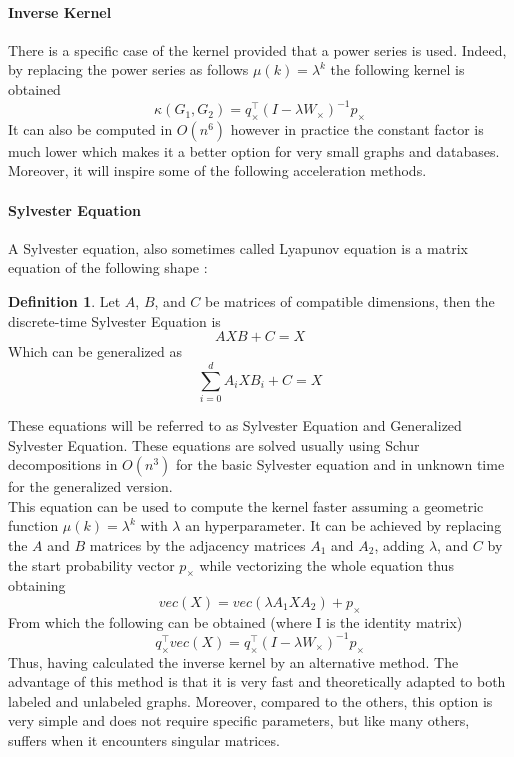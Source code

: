 \documentclass{article}
\theoremstyle{definition}
\newtheorem{definition}{Definition}
\begin{document}
\paragraph{Inverse Kernel}
There is a specific case of the kernel provided that a power series is used. Indeed, by replacing the power series as follows $\mu(k)=\lambda^k$ the following kernel is obtained 
\begin{equation}
	\kappa(G_1,G_2)=q_{\times}^{\top}(I-\lambda W_\times)^{-1}p_{\times}
\end{equation}
It can also be computed in $O(n^6)$ however in practice the constant factor is much lower which makes it a better option for very small graphs and databases. Moreover, it will inspire some of the following acceleration methods.
\paragraph{Sylvester Equation}
A Sylvester equation, also sometimes called Lyapunov equation is a matrix equation of the following shape :
\begin{definition}
	Let $A$, $B$, and $C$ be matrices of compatible dimensions, then the discrete-time Sylvester Equation is 
	\begin{equation}
	AXB+C=X
	\end{equation}
	Which can be generalized as
	\begin{equation}
		\sum_{i=0}^{d}A_{i}XB_{i}+C=X
	\end{equation}
\end{definition}
These equations will be referred to as Sylvester Equation and Generalized Sylvester Equation. These equations are solved usually using Schur decompositions in $O(n^3)$ for the basic Sylvester equation and in unknown time for the generalized version\cite{vishwanathan_graph_2010}.\\
This equation can be used to compute the kernel faster assuming a geometric function $\mu(k)=\lambda^k$ with $\lambda$ an hyperparameter. It can be achieved by replacing the $A$ and $B$ matrices by the adjacency matrices $A_1$ and $A_2$, adding $\lambda$, and $C$ by the start probability vector $p_\times$ while vectorizing the whole equation thus obtaining
\begin{equation}
	vec(X) = vec(\lambda A_{1}XA_{2}) + p_{\times}
\end{equation}
From which the following can be obtained (where I is the identity matrix)
\begin{equation}
	q_{\times}^{\top}vec(X)=q_{\times}^{\top}(I-\lambda W_{\times})^{-1}p_{\times}
\end{equation}
Thus, having calculated the inverse kernel by an alternative method. The advantage of this method is that it is very fast and theoretically adapted to both labeled and unlabeled graphs. Moreover, compared to the others, this option is very simple and does not require specific parameters, but like many others, suffers when it encounters singular matrices.  
\end{document}
